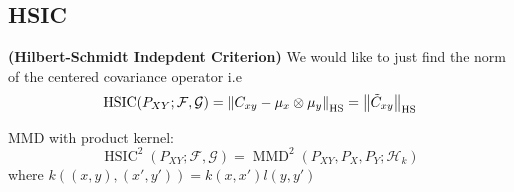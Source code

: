 \subsection{HSIC}
\begin{definition}{\textbf{(Hilbert-Schmidt Indepdent Criterion)}}
    We would like to just find the norm of the centered covariance operator i.e
    \begin{equation*}
        \operatorname{HSIC}(P_{XY};\mathcal{F}, \mathcal{G}) = \left\lVert C_{xy} - \mu_x\otimes\mu_y\right\rVert_{\operatorname{HS}} = \left\lVert\tilde{C}_{xy}\right\rVert_{\operatorname{HS}}
    \end{equation*}
\end{definition}
\begin{theorem}
    MMD with product kernel:
    \begin{equation*}
        \operatorname{HSIC}^2(P_{XY};\mathcal{F}, \mathcal{G}) = \operatorname{MMD}^2(P_{XY}, P_X, P_Y ; \mathcal{H}_k)
    \end{equation*}
    where $k((x, y), (x', y')) = k(x,x')l(y,y')$
\end{theorem}
